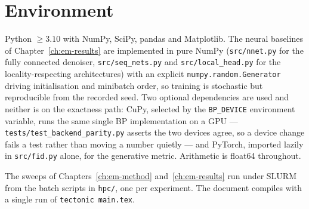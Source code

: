 \section{Environment}

Python $\geq 3.10$ with NumPy, SciPy, pandas and Matplotlib. The neural
baselines of Chapter~\ref{ch:em-results} are implemented in pure NumPy
(\texttt{src/nnet.py} for the fully connected denoiser,
\texttt{src/seq\_nets.py} and \texttt{src/local\_head.py} for the
locality-respecting architectures) with an explicit
\texttt{numpy.random.Generator} driving initialisation and minibatch order,
so training is stochastic but reproducible from the recorded seed. Two
optional dependencies are used and neither is on the exactness path: CuPy,
selected by the \texttt{BP\_DEVICE} environment variable, runs the same
single BP implementation on a GPU --- \texttt{tests/test\_backend\_parity.py}
asserts the two devices agree, so a device change fails a test rather than
moving a number quietly --- and PyTorch, imported lazily in
\texttt{src/fid.py} alone, for the generative metric. Arithmetic is float64
throughout.

The sweeps of Chapters~\ref{ch:em-method} and~\ref{ch:em-results} run under
SLURM from the batch scripts in \texttt{hpc/}, one per experiment. The
document compiles with a single run of \texttt{tectonic main.tex}.

\setlength{\emergencystretch}{0pt}
